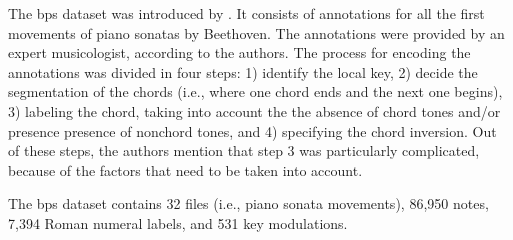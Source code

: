 

The \gls{bps} dataset was introduced by
\textcite{chen2018functional}. It consists of annotations
for all the first movements of piano sonatas by Beethoven.
The annotations were provided by an expert musicologist,
according to the authors. The process for encoding the
annotations was divided in four steps: 1) identify the local
key, 2) decide the segmentation of the chords (i.e., where
one chord ends and the next one begins), 3) labeling the chord,
taking into account the the absence of chord tones and/or
presence presence of nonchord tones, and 4) specifying the
chord inversion. Out of these steps, the authors mention
that step 3 was particularly complicated, because of the
factors that need to be taken into account. 

The \gls{bps} dataset contains 32 files (i.e., piano sonata
movements), 86,950 notes, 7,394 Roman numeral labels, and
531 key modulations.